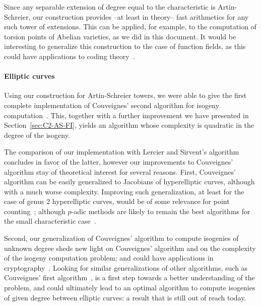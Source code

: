 Since any separable extension of degree equal to the characteristic is
Artin-Schreier, our construction provides --at least in theory-- fast
arithmetics for any such tower of extensions.  This can be applied,
for example, to the computation of torsion points of Abelian
varieties, as we did in this document. It would be interesting to
generalize this construction to the case of function fields, as this
could have applications to coding
theory~\cite{garcia+stichtenoth96,shum-et-al01}.

\paragraph{Elliptic curves}
Using our construction for Artin-Schreier towers, we were able to give
the first complete implementation of Couveignes' second algorithm for
isogeny computation~\cite{couveignes96}. This, together with a further
improvement we have presented in Section~\ref{sec:C2-AS-FI}, yields an
algorithm whose complexity is quadratic in the degree of the isogeny.

The comparison of our implementation with Lercier and Sirvent's
algorithm \cite{lercier+sirvent08} concludes in favor of the latter,
however our improvements to Couveignes' algorithm stay of theoretical
interest for several reasons. First, Couveignes' algorithm can be
easily generalized to Jacobians of hyperelliptic curves, although with
a much worse complexity. Improving such generalization, at least for
the case of genus $2$ hyperelliptic curves, would be of some relevance
for point counting~\cite{schoof95,pila90,gaudry+schost04}; although
$p$-adic methods are likely to remain the best algorithms for the
small characteristic case~\cite{kedlaya01,denef+vercauteren06}.

Second, our generalization of Couveignes' algorithm to compute
isogenies of unknown degree sheds new light on Couveignes' algorithm
and on the complexity of the isogeny computation problem; and could
have applications in
cryptography~\cite{teske06,rostovtsev+stolbunov06}.  Looking for
similar generalizations of other algorithms, such as Couveignes' first
algorithm~\cite{couveignes94}, is a first step towards a better
understanding of the problem, and could ultimately lead to an optimal
algorithm to compute isogenies of given degree between elliptic
curves: a result that is still out of reach today.


